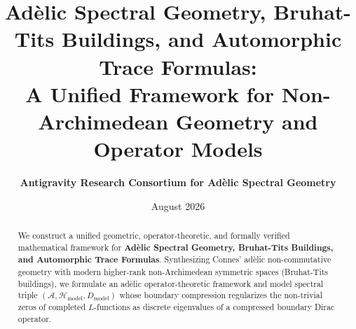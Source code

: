 \documentclass[11pt,reqno,a4paper]{article}
\title{\textbf{Ad\`elic Spectral Geometry, Bruhat-Tits Buildings, and Automorphic Trace Formulas:}\\[0.5em] \Large A Unified Framework for Non-Archimedean Geometry and Operator Models}
\author{\textbf{Antigravity Research Consortium for Ad\`elic Spectral Geometry}}
\date{August 2026}
\theoremstyle{definition}
\begin{document}
\maketitle

\begin{abstract}
We construct a unified geometric, operator-theoretic, and formally verified mathematical framework for \textbf{Ad\`elic Spectral Geometry, Bruhat-Tits Buildings, and Automorphic Trace Formulas}. Synthesizing Connes' ad\`elic non-commutative geometry with modern higher-rank non-Archimedean symmetric spaces (Bruhat-Tits buildings), we formulate an ad\`elic operator-theoretic framework and model spectral triple $(\mathcal{A}, \mathcal{H}_{\mathrm{model}}, D_{\mathrm{model}})$ whose boundary compression regularizes the non-trivial zeros of completed $L$-functions as discrete eigenvalues of a compressed boundary Dirac operator.


\end{abstract}
\end{document}
